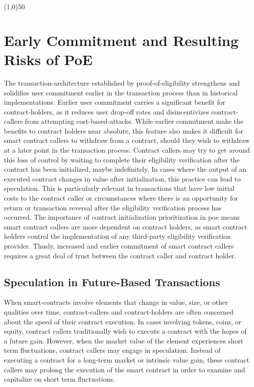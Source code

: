 \documentclass{article}
\begin{document}
\begin{center}
\line(1,0){50}
\end{center}

\section{Early Commitment and Resulting Risks of PoE}
The \gls{transaction-architecture} established by \Gls{proof-of-eligibility} strengthens and solidifies user commitment earlier in the transaction process than in historical implementations. Earlier user commitment carries a significant benefit for \glspl{contract-holder}, as it reduces user drop-off rates and disincentivizes \glspl{contract-caller} from attempting \glspl{cost-based-attack}. While earlier commitment make the benefits to contract holders near absolute, this feature also makes it difficult for smart contract callers to withdraw from a contract, should they wish to withdraw at a later point in the transaction process. Contract callers may try to get around this loss of control by waiting to complete their eligibility verification after the contract has been initialized, maybe indefinitely. In cases where the output of an executed contract changes in value after initialization, this practice can lead to speculation. This is particularly relevant in transactions that have low initial costs to the contract caller or circumstances where there is an opportunity for return or transaction reversal after the eligibility verification process has occurred. The importance of contract initialization prioritization in \acrshort{poe} means smart contract callers are more dependent on contract holders, as smart contract holders control the implementation of any third-party eligibility verification provider. Thusly, increased and earlier commitment of smart contract callers requires a great deal of trust between the contract caller and contract holder.

\subsection{Speculation in Future-Based Transactions}
When \glspl{smart-contract} involve elements that change in value, size, or other qualities over time, \glspl{contract-caller} and \glspl{contract-holder} are often concerned about the speed of their contract execution. In cases involving tokens, coins, or equity, contract callers traditionally wish to execute a contract with the hopes of a future gain. However, when the market value of the element experiences short term fluctuations, contract callers may engage in speculation. Instead of executing a contract for a long-term market or intrinsic value gain, these contract callers may prolong the execution of the smart contract in order to examine and capitalize on short term fluctuations.
\end{document}
